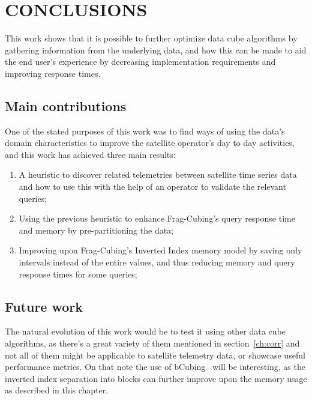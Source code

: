 
\chapter{CONCLUSIONS}\label{ch:concl}

This work shows that it is possible to further optimize data cube algorithms by gathering information from the underlying data, and how this can be made to aid the end user's experience by decreasing implementation requirements and improving response times.

\section{Main contributions}\label{ch:concl:contrib}

One of the stated purposes of this work was to find ways of using the data's domain characteristics to improve the satellite operator's day to day activities, and this work has achieved three main results:

\begin{enumerate}
\item A heuristic to discover related telemetries between satellite time series data and how to use this with the help of an operator to validate the relevant queries;
\item Using the previous heuristic to enhance Frag-Cubing's query response time and memory by pre-partitioning the data;
\item Improving upon Frag-Cubing's Inverted Index memory model by saving only intervals instead of the entire values, and thus reducing memory and query response times for some queries;
\end{enumerate}


\section{Future work}\label{ch:concl:future}

The natural evolution of this work would be to test it using other data cube algorithms, as there's a great variety of them mentioned in section~\ref{ch:corr} and not all of them might be applicable to satellite telemetry data, or showcase useful performance metrics.
On that note the use of bCubing~\cite{silva:2015:abordagensParaCubo} will be interesting, as the inverted index separation into blocks can further improve upon the memory usage as described in this chapter.

